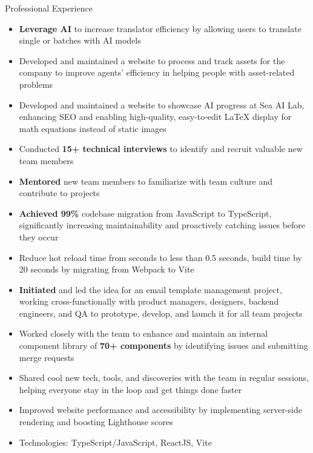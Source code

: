 \documentclass{resume}
\begin{document}
\begin{experienceSection}{Professional Experience}
    \experienceItem[
        company={Sea Limited},
        location={Singapore},
        position={Senior Frontend Engineer},
        duration={Jan 2024 – Present}
    ]
    \begin{itemize}
        \itemsep -6pt {}
        \item \textbf{Leverage AI} to increase translator efficiency by allowing users to translate single or batches with AI models
        \item Developed and maintained a website to process and track assets for the company to improve agents' efficiency in helping people with asset-related problems
        \item Developed and maintained a website to showcase AI progress at Sea AI Lab, enhancing SEO and enabling high-quality, easy-to-edit LaTeX display for math equations instead of static images
        \item Conducted \textbf{15+ technical interviews} to identify and recruit valuable new team members
        \item \textbf{Mentored} new team members to familiarize with team culture and contribute to projects
    \end{itemize}

    \experienceItem[
        company={Sea Limited},
        location={Singapore},
        position={Frontend Engineer},
        duration={Aug 2021 – Dec 2023}
    ]
    \begin{itemize}
        \itemsep -6pt {}
        \item \textbf{Achieved 99\%} codebase migration from JavaScript to TypeScript, significantly increasing maintainability and proactively catching issues before they occur
        \item Reduce hot reload time from seconds to less than 0.5 seconds, build time by 20 seconds by migrating from Webpack to Vite
        \item \textbf{Initiated} and led the idea for an email template management project, working cross-functionally with product managers, designers, backend engineers, and QA to prototype, develop, and launch it for all team projects
        \item Worked closely with the team to enhance and maintain an internal component library of \textbf{70+ components} by identifying issues and submitting merge requests
        \item Shared cool new tech, tools, and discoveries with the team in regular sessions, helping everyone stay in the loop and get things done faster
        \item Improved website performance and accessibility by implementing server-side rendering and boosting Lighthouse scores
        \item Technologies: TypeScript/JavaScript, ReactJS, Vite
    \end{itemize}


\end{experienceSection}
\end{document}
